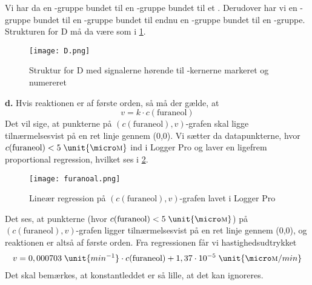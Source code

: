 \documentclass{report}
\begin{document}
Vi har da en -gruppe bundet til en -gruppe bundet til et .
Derudover har vi en -gruppe bundet til en -gruppe bundet til endnu en -gruppe bundet til en -gruppe.
Strukturen for D må da være som i \cref{fig:D}.
\begin{figure}[H]
\begin{center}
  \texttt{[image: D.png]}
\end{center}
\caption{Struktur for D med signalerne hørende til -kernerne markeret og numereret}
\label{fig:D}
\end{figure}
\noindent \textbf{d.}
Hvis reaktionen er af første orden, så må der gælde, at 
\[
v= k \cdot c(\text{furaneol} )
\] 
Det vil sige, at punkterne på $(c(\text{furaneol} ), v)$-grafen skal ligge tilnærmelsesvist på en ret linje gennem (0,0).
Vi sætter da datapunkterne, hvor $c(\text{furaneol} ) < 5 \;\unit{\micro \textsc{m}} $ ind i Logger Pro og laver en ligefrem proportional regression, hvilket ses i \cref{fig:furanoal}.

\begin{figure}[H]
\begin{center}
  \texttt{[image: furanoal.png]}
\end{center}
\caption{Lineær regression på $(c(\text{furaneol} ), v)$-grafen lavet i Logger Pro}
\label{fig:furanoal}
\end{figure}
Det ses, at punkterne (hvor $c(\text{furaneol} ) < 5 \;\unit{\micro \textsc{m}} $) på $(c(\text{furaneol} ), v)$-grafen ligger tilnærmelsesvist på en ret linje gennem (0,0), og reaktionen er altså af første orden.
Fra regressionen får vi hastighedsudtrykket
\begin{equation*}
\begin{split}
  v=0,000703 \;\unit{min ^{-1}} \cdot c(\text{furaneol} ) + 1,37 \cdot 10 ^{-5} \;\unit{\micro \textsc{m}/min} 
\end{split}
\end{equation*}
Det skal bemærkes, at konstantleddet er så lille, at det kan ignoreres.
\end{document}
